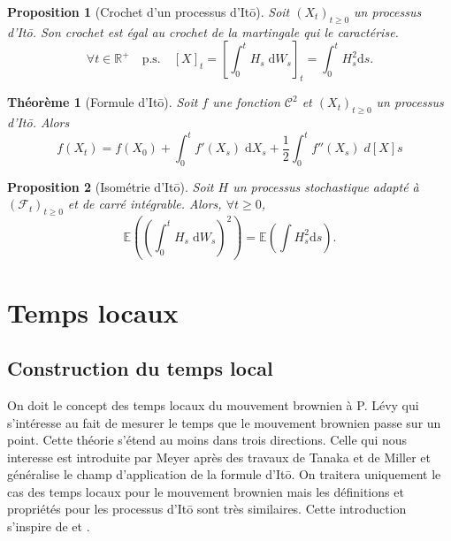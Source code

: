 \documentclass[openany]{book}
\newcommand{\F}{\mathscr{F}}
\newcommand{\R}{\mathbb{R}}
\newcommand{\E}{\mathbb{E}}
\newcommand{\1}{\mathbbm{1}}
\renewcommand{\d}{\mathrm{d}}
\theoremstyle{thmfont}
\newtheorem{theorem}{Théorème}[chapter]
\theoremstyle{deffont}
\theoremstyle{thmfont}
\newtheorem{prop}[prop]{Proposition}
\theoremstyle{deffont}
\begin{document}
 \begin{prop}[Crochet d'un processus d'Itō] Soit $(X_t)_{t\geq0}$ un processus d'Itō. Son crochet est égal au crochet de la martingale qui le caractérise.
   $$\forall t \in  \R^+ \quad\text{p.s.}\quad [X]_t = \left[\int_0^tH_s \;\d W_s\right]_t = \int_0^t H_s^2 \d s.$$
  \end{prop}

  \begin{theorem}[Formule d'Itō]
  Soit $f$ une fonction $\mathcal C^2$ et $(X_t)_{t\geq0}$ un processus d'Itō. Alors
  \begin{equation}
    f(X_t) = f(X_0) + \int_0^t f'(X_s) \;\d X_s + \dfrac{1}{2} \int_0^t f''(X_s) \;d[X]s
  \end{equation}
  \end{theorem}

\begin{prop}[Isométrie d'Itō] Soit $H$ un processus stochastique adapté à $(\F_t)_{t\geq0}$ et de carré intégrable. Alors, $\forall t \geq 0$,
  \begin{equation}
    \E\left( \left(\int_0^t H_s \;\d W_s\right)^2\right) = \E\left( \int H_s^2 \d s\right).
  \end{equation}
  

  \end{prop}
\chapter{Temps locaux}

\section{Construction du temps local}\label{sec:ConstrTempsLoc}

On doit le concept des temps locaux du mouvement brownien à P. Lévy qui s’intéresse au fait de mesurer le temps que le mouvement brownien passe sur un point. Cette théorie s'étend au moins dans trois directions.
Celle qui nous interesse est introduite par Meyer après des travaux de Tanaka et de Miller et généralise le champ d'application de la formule d'Itō. On traitera uniquement le cas des temps locaux pour le mouvement brownien mais les définitions et propriétés pour les processus d'Itō sont très similaires. Cette introduction s'inspire de \cite{revuz-yor} et \cite{almostsure}.\\
\end{document}

